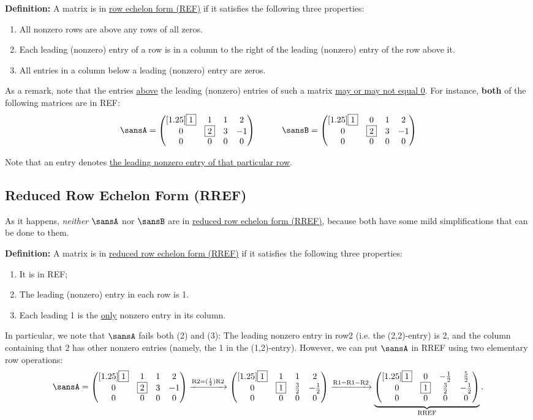 \documentclass[12 pt]{article}
\newcommand{\pmat}[1]{\begin{pmatrix}[1.25]#1\end{pmatrix}}
\begin{document}
\noindent\textbf{Definition:} A matrix is in \ul{row echelon form (REF)} if it satisfies the following three properties:
\begin{enumerate}
	\item All nonzero rows are above any rows of all zeros.
	\item Each leading (nonzero) entry of a row is in a column to the right of the leading (nonzero) entry of the row above it.
	\item All entries in a column below a leading (nonzero) entry are zeros.
\end{enumerate}

As a remark, note that the entries \ul{above} the leading (nonzero) entries of such a matrix \ul{may or may not equal 0}. For instance, \textbf{both} of the following matrices are in REF:
\[
\sansA=\pmat{\fbox{1} & 1 & 1 & 2 \\ 0 & \fbox{2} & 3 & -1 \\ 0 & 0 & 0 & 0}\quad\quad\quad
\sansB=\pmat{\fbox{1} & 0 & 1 & 2 \\ 0 & \fbox{2} & 3 & -1 \\ 0 & 0 & 0 & 0}
\]

\noindent Note that an entry  denotes \ul{the leading nonzero entry of that particular row}.

\subsection*{Reduced Row Echelon Form (RREF)}
As it happens, \textit{neither} $\sansA$ nor $\sansB$ are in \ul{reduced row echelon form (RREF)}, because both have some mild simplifications that can be done to them.\vspace{3mm}

\noindent\textbf{Definition:} A matrix is in \ul{reduced row echelon form (RREF)} if it satisfies the following three properties:
\begin{enumerate}
	\item It is in REF;
	\item The leading (nonzero) entry in each row is 1.
	\item Each leading 1 is the \ul{only} nonzero entry in its column.
\end{enumerate}

In particular, we note that $\sansA$ fails both (2) and (3): The leading nonzero entry in row2 (i.e. the (2,2)-entry) is 2, and the column containing that 2 has other nonzero entries (namely, the 1 in the (1,2)-entry). However, we can put $\sansA$ in RREF using two elementary row operations:
\[
\sansA=\pmat{\fbox{1} & 1 & 1 & 2 \\ 0 & \fbox{2} & 3 & -1 \\ 0 & 0 & 0 & 0}
\xrightarrow{\text{R2}=(\frac{1}{2})\text{R2}}
\pmat{\fbox{1} & 1 & 1 & 2 \\ 0 & \fbox{1} & \frac{3}{2} & -\frac{1}{2} \\ 0 & 0 & 0 & 0}
\xrightarrow{\text{R1}=\text{R1}-\text{R2}}
\underbrace{\pmat{\fbox{1} & 0 & -\frac{1}{2} & \frac{5}{2} \\ 0 & \fbox{1} & \frac{3}{2} & -\frac{1}{2} \\ 0 & 0 & 0 & 0}}_{\text{RREF}}.
\]
\end{document}
